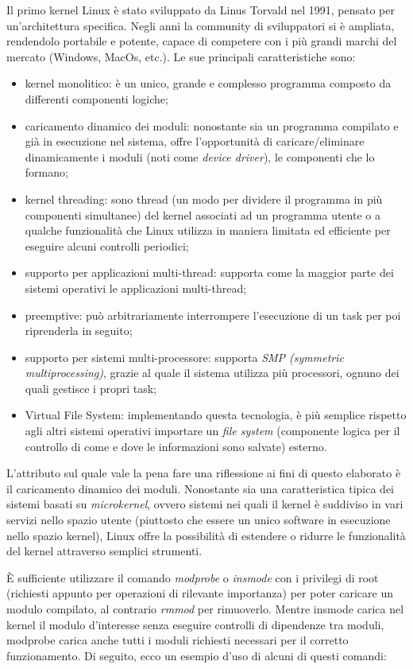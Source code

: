 Il primo kernel Linux è stato sviluppato da Linus Torvald nel 1991, pensato per un'architettura specifica. Negli anni la community di sviluppatori si è ampliata, rendendolo portabile e potente, capace di competere con i più grandi marchi del mercato (Windows, MacOs, etc.). Le sue principali caratteristiche sono:

\begin{itemize}
\item kernel monolitico: è un unico, grande e complesso programma composto da differenti componenti logiche;
\item caricamento dinamico dei moduli: nonostante sia un programma compilato e già in esecuzione nel sistema, offre l'opportunità di caricare/eliminare dinamicamente i moduli (noti come \emph{device driver}), le componenti che lo formano;
\item kernel threading: sono thread (un modo per dividere il programma in più componenti simultanee) del kernel associati ad un programma utente o a qualche funzionalità che Linux utilizza in maniera limitata ed efficiente per eseguire alcuni controlli periodici;
\item supporto per applicazioni multi-thread: supporta come la maggior parte dei sistemi operativi le applicazioni multi-thread;
\item preemptive: può arbitrariamente interrompere l'esecuzione di un task per poi riprenderla in seguito;
\item supporto per sistemi multi-processore: supporta \emph{SMP (symmetric multiprocessing)}, grazie al quale il sistema utilizza più processori, ognuno dei quali gestisce i propri task;
\item Virtual File System: implementando questa tecnologia, è più semplice rispetto agli altri sistemi operativi importare un \emph{file system} (componente logica per il controllo di come e dove le informazioni sono salvate) esterno.
\end{itemize}
L'attributo sul quale vale la pena fare una riflessione ai fini di questo elaborato è il caricamento dinamico dei moduli. Nonostante sia una caratteristica tipica dei sistemi basati su \emph{microkernel}, ovvero sistemi nei quali il kernel è suddiviso in vari servizi nello spazio utente (piuttosto che essere un unico software in esecuzione nello spazio kernel), Linux offre la possibilità di estendere o ridurre le funzionalità del kernel attraverso semplici strumenti.

È sufficiente utilizzare il comando \emph{modprobe} o \emph{insmode} con i privilegi di root (richiesti appunto per operazioni di rilevante importanza) per poter caricare un modulo compilato, al contrario \emph{rmmod} per rimuoverlo. Mentre insmode carica nel kernel il modulo d'interesse senza eseguire controlli di dipendenze tra moduli, modprobe carica anche tutti i moduli richiesti necessari per il corretto funzionamento.
Di seguito, ecco un esempio d'uso di alcuni di questi comandi:

